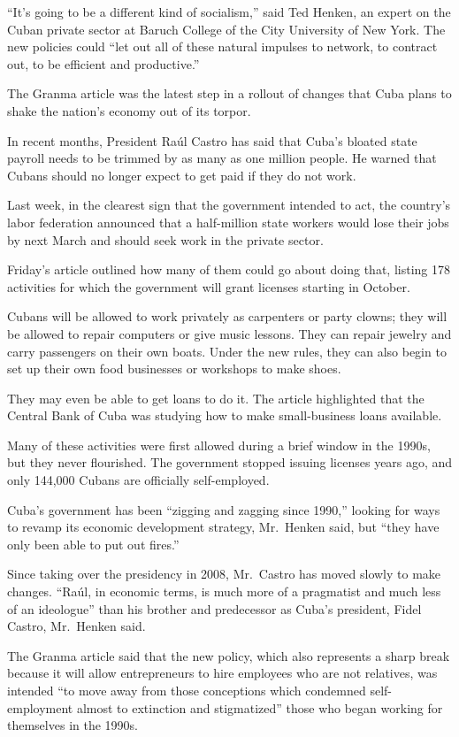 ﻿\documentclass[12pt]{article}
\begin{document}
``It's going to be a different kind of socialism,'' said Ted Henken, an expert on the Cuban private
sector at Baruch College of the City University of New York. The new policies could ``let out all of
these natural impulses to network, to contract out, to be efficient and productive.''

The Granma article was the latest step in a rollout of changes that Cuba plans to shake the nation's
economy out of its torpor.

In recent months, President Raúl Castro has said that Cuba's bloated state payroll needs to be
trimmed by as many as one million people. He warned that Cubans should no longer expect to get paid
if they do not work.

Last week, in the clearest sign that the government intended to act, the country's labor federation
announced that a half-million state workers would lose their jobs by next March and should seek work
in the private sector.

Friday's article outlined how many of them could go about doing that, listing 178 activities for
which the government will grant licenses starting in October.

Cubans will be allowed to work privately as carpenters or party clowns; they will be allowed to
repair computers or give music lessons. They can repair jewelry and carry passengers on their own
boats. Under the new rules, they can also begin to set up their own food businesses or workshops to
make shoes.

They may even be able to get loans to do it. The article highlighted that the Central Bank of Cuba
was studying how to make small-business loans available.

Many of these activities were first allowed during a brief window in the 1990s, but they never
flourished. The government stopped issuing licenses years ago, and only 144,000 Cubans are
officially self-employed.

Cuba's government has been ``zigging and zagging since 1990,'' looking for ways to revamp its
economic development strategy, Mr.~Henken said, but ``they have only been able to put out fires.''

Since taking over the presidency in 2008, Mr.~Castro has moved slowly to make changes. ``Raúl, in
economic terms, is much more of a pragmatist and much less of an ideologue'' than his brother and
predecessor as Cuba's president, Fidel Castro, Mr.~Henken said.

The Granma article said that the new policy, which also represents a sharp break because it will
allow entrepreneurs to hire employees who are not relatives, was intended ``to move away from those
conceptions which condemned self-employment almost to extinction and stigmatized'' those who began
working for themselves in the 1990s.
\end{document}

